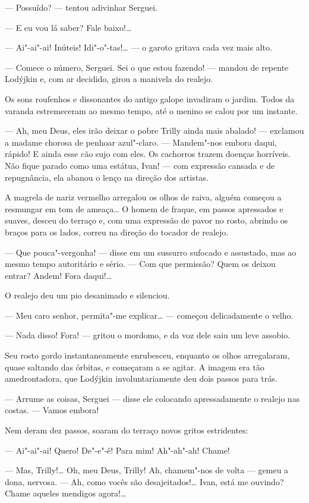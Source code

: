 --- Possuído? --- tentou adivinhar Serguei.

--- E eu vou lá saber? Fale baixo!\ldots{}

--- Ai"-ai"-ai! Inúteis! Idi"-o"-tas!\ldots{} --- o garoto gritava cada vez mais
alto.

--- Comece o número, Serguei. Sei o que estou fazendo! --- mandou de
repente Lodýjkin e, com ar decidido, girou a manivela do realejo.

Os sons roufenhos e dissonantes do antigo galope invadiram o jardim.
Todos da varanda estremeceram ao mesmo tempo, até o menino se calou por
um instante.

--- Ah, meu Deus, eles irão deixar o pobre Trilly ainda mais abalado!
--- exclamou a madame chorosa de penhoar azul"-claro. --- Mandem"-nos
embora daqui, rápido! E ainda esse cão sujo com eles. Os cachorros
trazem doenças horríveis. Não fique parado como uma estátua, Ivan! ---
com expressão cansada e de repugnância, ela abanou o lenço na direção
dos artistas.

A magrela de nariz vermelho arregalou os olhos de raiva, alguém começou
a resmungar em tom de ameaça\ldots{} O homem de fraque, em passos apressados
e suaves, desceu do terraço e, com uma expressão de pavor no rosto,
abrindo os braços para os lados, correu na direção do tocador de
realejo.

--- Que pouca"-vergonha! --- disse em um sussurro sufocado e assustado,
mas ao mesmo tempo autoritário e sério. --- Com que permissão? Quem os
deixou entrar? Andem! Fora daqui!\ldots{}

O realejo deu um pio desanimado e silenciou.

--- Meu caro senhor, permita"-me explicar\ldots{} --- começou delicadamente o
velho.

--- Nada disso! Fora! --- gritou o mordomo, e da voz dele saiu um leve
assobio.

Seu rosto gordo instantaneamente enrubesceu, enquanto os olhos
arregalaram, quase saltando das órbitas, e começaram a se agitar. A
imagem era tão amedrontadora, que Lodýjkin involuntariamente deu dois
passos para trás.

--- Arrume as coisas, Serguei --- disse ele colocando apressadamente o
realejo nas costas. --- Vamos embora!

Nem deram dez passos, soaram do terraço novos gritos estridentes:

--- Ai"-ai"-ai! Quero! De"-e"-ê! Para mim! Ah"-ah"-ah! Chame!

--- Mas, Trilly!\ldots{} Oh, meu Deus, Trilly! Ah, chamem"-nos de volta ---
gemeu a dona, nervosa. --- Ah, como vocês são desajeitados!\ldots{} Ivan,
está me ouvindo? Chame aqueles mendigos agora!\ldots{}

